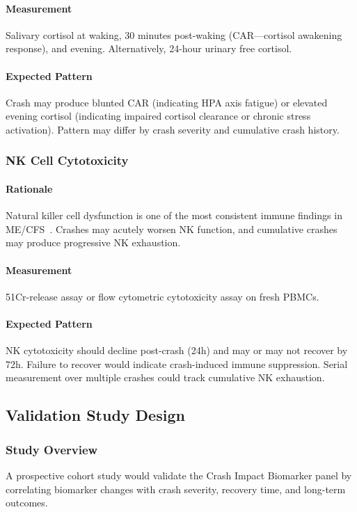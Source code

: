 \paragraph{Measurement}
Salivary cortisol at waking, 30 minutes post-waking (CAR---cortisol awakening response), and evening. Alternatively, 24-hour urinary free cortisol.

\paragraph{Expected Pattern}
Crash may produce blunted CAR (indicating HPA axis fatigue) or elevated evening cortisol (indicating impaired cortisol clearance or chronic stress activation). Pattern may differ by crash severity and cumulative crash history.

\subsubsection{NK Cell Cytotoxicity}

\paragraph{Rationale}
Natural killer cell dysfunction is one of the most consistent immune findings in ME/CFS~\cite{Brenu2011NK}. Crashes may acutely worsen NK function, and cumulative crashes may produce progressive NK exhaustion.

\paragraph{Measurement}
51Cr-release assay or flow cytometric cytotoxicity assay on fresh PBMCs.

\paragraph{Expected Pattern}
NK cytotoxicity should decline post-crash (24h) and may or may not recover by 72h. Failure to recover would indicate crash-induced immune suppression. Serial measurement over multiple crashes could track cumulative NK exhaustion.

\subsection{Validation Study Design}

\subsubsection{Study Overview}
A prospective cohort study would validate the Crash Impact Biomarker panel by correlating biomarker changes with crash severity, recovery time, and long-term outcomes.

